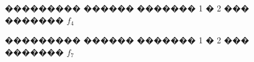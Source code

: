 \documentclass[a4paper]{article}
\begin{document}
\begin{figure}[h]
  \begin{minipage}[h]{0.9\linewidth}
  \end{minipage}
  \vfill
  \begin{minipage}[h]{0.9\linewidth}
  \end{minipage}
  \caption{��������� ������ ������� 1 � 2 ��� ������� $f_4$}
  \label{ris:image1}
\end{figure}

\begin{figure}[h]
  \begin{minipage}[h]{0.9\linewidth}
  \end{minipage}
  \vfill
  \begin{minipage}[h]{0.9\linewidth}
  \end{minipage}
  \caption{��������� ������ ������� 1 � 2 ��� ������� $f_7$}
  \label{ris:image1}
\end{figure}
\end{document}
